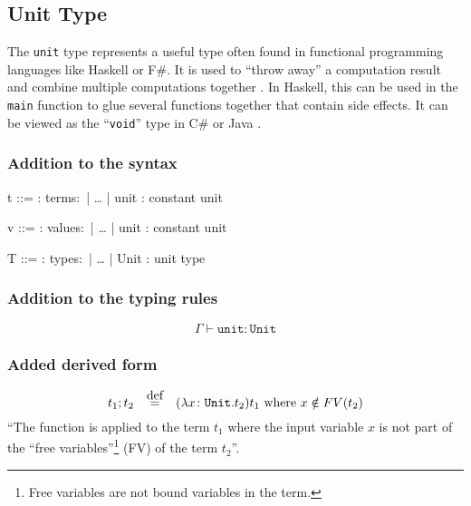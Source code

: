 \subsection{Unit Type}

The \texttt{unit} type represents a useful type often found in functional
programming languages like Haskell or F\#. It is used to ``throw away'' a
computation result and combine multiple computations together \cite{pierce2002ProgLang}.
In Haskell, this can be used in the \texttt{main} function to glue
several functions together that contain side effects. It can be viewed as
the ``\texttt{void}'' type in C\# or Java \cite{pierce2002ProgLang}.

\subsubsection{Addition to the syntax \cite{pierce2002ProgLang}}
\begin{bnfgrammar}
    t ::= : terms$\colon$
    | \dots
    | unit : constant unit
\end{bnfgrammar}\leavevmode\newline

\begin{bnfgrammar}
    v ::= : values$\colon$
    | \dots
    | unit : constant unit
\end{bnfgrammar}\leavevmode\newline

\begin{bnfgrammar}
    T ::= : types$\colon$
    | \dots
    | Unit : unit type
\end{bnfgrammar}\leavevmode\newline

\subsubsection{Addition to the typing rules \cite{pierce2002ProgLang}}
\begin{equation*}
    \tag{Unit}
    \Gamma \vdash \texttt{unit} \colon \texttt{Unit}
\end{equation*}\leavevmode\newline

\subsubsection{Added derived form \cite{pierce2002ProgLang}}
\begin{equation*}
    t_1 ; t_2 \quad \defeq \quad (\lambda x \colon \texttt{Unit} . t_2) t_1 \text{ where } x \notin FV(t_2)
\end{equation*}
``The function is applied to the term $t_1$ where the input variable $x$ is not
part of the ``free variables''\footnote{Free variables are not bound variables in the term.}
(FV) of the term $t_2$''.

